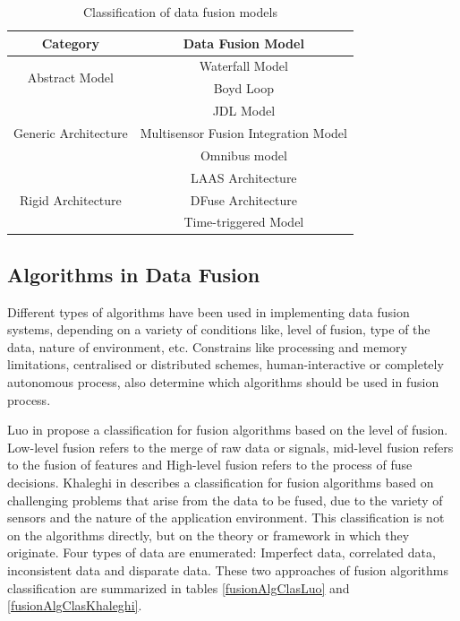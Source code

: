 \begin{table}
\footnotesize
\centering
\begin{tabular}{|c | c|}
\hline
\textbf{Category} & \textbf{Data Fusion Model} \\
\hline
\multirow{2}{*}{Abstract Model} & Waterfall Model \cite{Harris1998} \\
& Boyd Loop \cite{Boyd1987} \\
\hline
\multirow{3}{*}{Generic Architecture} & JDL Model \cite{White1991} \\
& Multisensor Fusion Integration Model \cite{Luo1989} \\
& Omnibus model \cite{Bedworth2000} \\
\hline
\multirow{3}{*}{Rigid Architecture} & LAAS Architecture \cite{Alami1998} \\
& DFuse Architecture \cite{Kumar2003} \\
& Time-triggered Model \cite{Elmenreich2001} \\
\hline
\end{tabular}
\caption{Classification of data fusion models}
\label{fusionModelsClas}
\end{table}


\subsection{Algorithms in Data Fusion}

Different types of algorithms have been used in implementing data fusion systems, depending on a variety of conditions like, level of fusion, type of the data, nature of environment, etc. Constrains like processing and memory limitations, centralised or distributed schemes, human-interactive or completely autonomous process, also determine which algorithms should be used in fusion process.

Luo in \cite{Luo2011} propose a classification for fusion algorithms based on the level of fusion. Low-level fusion refers to the merge of raw data or signals, mid-level fusion refers to the fusion of features and High-level fusion refers to the process of fuse decisions. Khaleghi in \cite{Khaleghi2013} describes a classification for fusion algorithms based on challenging problems that arise from the data to be fused, due to the variety of sensors and the nature of the application environment. This classification is not on the algorithms directly, but on the theory or framework in which they originate. Four types of data are enumerated: Imperfect data, correlated data, inconsistent data and disparate data. These two approaches of fusion algorithms classification are summarized in tables \ref{fusionAlgClasLuo} and \ref{fusionAlgClasKhaleghi}.

